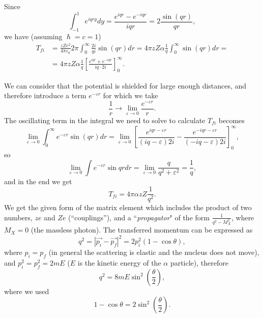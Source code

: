 Since
\begin{equation*}
    \int_{-1}^{1}e^{iqry}dy = \frac{e^{iqr}-e^{-iqr}}{iqr} = 2\frac{\sin{(qr)}}{qr},
\end{equation*}
we have (assuming $\hslash=c=1$)
\begin{equation*}
    \begin{split}
        T_{fi} & = \frac{zZe^2}{4\pi\varepsilon_0}2\pi\int_{0}^{\infty}\frac{2i}{qi}\sin{(qr)}dr = 4\pi zZ\alpha\frac{1}{q}\int_{0}^{\infty}\sin(qr)dr = \\
        & = 4\pi zZ\alpha \frac{1}{q}\left[\frac{e^{iqr}+e^{-iqr}}{iq\cdot2i}\right]_{0}^{\infty}.
    \end{split}
\end{equation*}

We can consider that the potential is shielded for large enough distances, and therefore introduce a term $e^{-\varepsilon r}$ for which we take
\begin{equation*}
    \frac{1}{r}\rightarrow \lim_{\varepsilon\rightarrow0}\frac{e^{-\varepsilon r}}{r}.
\end{equation*}
The oscillating term in the integral we need to solve to calculate $T_{fi}$ becomes
\begin{equation*}
    \lim_{\varepsilon\rightarrow 0}\int_{0}^{\infty}e^{-\varepsilon r}\sin{(qr)}dr = \lim_{\varepsilon\rightarrow 0}\left[\frac{e^{iqr-\varepsilon r}}{(iq-\varepsilon )2i}-\frac{e^{-iqr-\varepsilon r}}{(-iq-\varepsilon)2i}\right]_{0}^{\infty},
\end{equation*}
so
\begin{equation*}
    \lim_{\varepsilon\rightarrow 0}\int e^{-\varepsilon r}\sin{qr} dr = \lim_{\varepsilon \rightarrow 0}\frac{q}{q^2+\varepsilon^2} = \frac{1}{q},
\end{equation*}
and in the end we get
\begin{equation*}
    T_{fi} = 4\pi\alpha z Z \frac{1}{q^2}.
\end{equation*}
We get the given form of the matrix element which includes the product of two numbers, $ze$ and $Ze$ (``couplings''), and a ``\emph{propagator}" of the form $\frac{1}{q^2-M_X^2}$, where $M_X = 0$ (the massless photon).
The transferred momentum can be expressed as
\begin{equation*}
    q^2 = |\Vec{p_i} - \Vec{p_f}|^2 = 2p_i^2(1-\cos{\theta}),
\end{equation*}
where $p_i = p_f$ (in general the scattering is elastic and the nucleus does not move), and $p_i^2 = p_f^2 = 2mE$ ($E$ is the kinetic energy of the $\alpha$ particle), therefore
\begin{equation*}
    q^2 = 8mE\sin^2\left(\frac{\theta}{2}\right),
\end{equation*}
where we used
\begin{equation*}
    1-\cos{\theta} = 2\sin^2\left(\frac{\theta}{2}\right).
\end{equation*}


